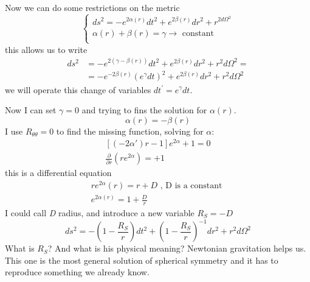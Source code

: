 Now we can do some restrictions on the metric
\begin{equation}
\begin{cases}
ds^{2} = -e ^{2\alpha \left( r \right)}dt^{2} + e^{2\beta \left( r \right)} dr^{2} + r^{2 d\Omega ^{2}} \\
 \alpha \left( r  \right) + \beta \left( r \right) = \gamma \to  \text{ constant }\\
\end{cases}
\end{equation}
this allows us to write
\begin{align}
	ds^{2} &= -e^{2\left( \gamma  - \beta \left( r \right) \right)} dt^{2} + e^{2\beta \left( r \right)} dr^{2} + r^{2} d\Omega^{2} = \\
	       & = -e ^{-2\beta \left( r \right)} \left( e^{\gamma }dt \right)^{2} + e^{2\beta\left( r \right) }dr^{2} + r^{2} d\Omega ^{2}  
\end{align}
we will operate this change of variables $dt^{\prime } = e^{\gamma }dt$.\par
Now I can set $\gamma =0$ and trying to fins the solution for $\alpha \left( r \right)$.
\[
\alpha \left( r \right) = - \beta \left( r \right)
\]
I use $R_{\theta \theta } = 0$ to find the missing function, solving for $\alpha $:
\begin{gather*}
	\left[ \left( -2\alpha \prime  \right)r-1\right]e^{2\alpha }+1 = 0 \\
	\frac{\partial }{\partial r} \left( re^{2\alpha } \right) = +1
\end{gather*}
this is a differential equation 
\begin{gather*}
re^{2\alpha }\left( r \right) = r + D \text{ , D is a constant } \\
e^{2\alpha \left( r \right)} = 1 + \frac{D}{r}
\end{gather*}
I could call \emph{D} radius, and introduce a new variable $R_{S} = - D$
\begin{equation}
ds^{2} = - \left( 1- \frac{R_{S}}{r} \right)dt^{2} + \left( 1 - \frac{R_{S}}{r} \right)^{-1} dr^{2} + r^{2}d\Omega ^{2}
\end{equation}
What is $R_{S}$? And what is his physical meaning? Newtonian gravitation helps us. This one is the most  general solution of spherical symmetry and it has to reproduce something we already know.\par

